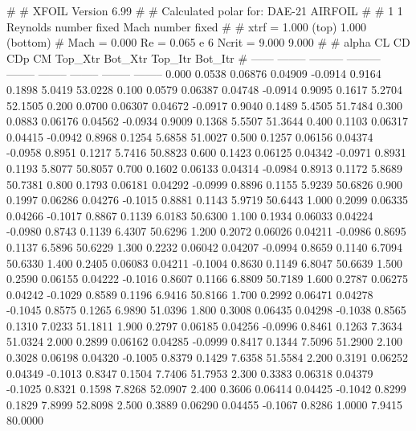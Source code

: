 #  
#       XFOIL         Version 6.99
#  
# Calculated polar for: DAE-21 AIRFOIL                                  
#  
# 1 1 Reynolds number fixed          Mach number fixed         
#  
# xtrf =   1.000 (top)        1.000 (bottom)  
# Mach =   0.000     Re =     0.065 e 6     Ncrit =   9.000  9.000
#  
#   alpha    CL        CD       CDp       CM     Top_Xtr  Bot_Xtr  Top_Itr  Bot_Itr
#  ------ -------- --------- --------- -------- -------- -------- -------- --------
   0.000   0.0538   0.06876   0.04909  -0.0914   0.9164   0.1898   5.0419  53.0228
   0.100   0.0579   0.06387   0.04748  -0.0914   0.9095   0.1617   5.2704  52.1505
   0.200   0.0700   0.06307   0.04672  -0.0917   0.9040   0.1489   5.4505  51.7484
   0.300   0.0883   0.06176   0.04562  -0.0934   0.9009   0.1368   5.5507  51.3644
   0.400   0.1103   0.06317   0.04415  -0.0942   0.8968   0.1254   5.6858  51.0027
   0.500   0.1257   0.06156   0.04374  -0.0958   0.8951   0.1217   5.7416  50.8823
   0.600   0.1423   0.06125   0.04342  -0.0971   0.8931   0.1193   5.8077  50.8057
   0.700   0.1602   0.06133   0.04314  -0.0984   0.8913   0.1172   5.8689  50.7381
   0.800   0.1793   0.06181   0.04292  -0.0999   0.8896   0.1155   5.9239  50.6826
   0.900   0.1997   0.06286   0.04276  -0.1015   0.8881   0.1143   5.9719  50.6443
   1.000   0.2099   0.06335   0.04266  -0.1017   0.8867   0.1139   6.0183  50.6300
   1.100   0.1934   0.06033   0.04224  -0.0980   0.8743   0.1139   6.4307  50.6296
   1.200   0.2072   0.06026   0.04211  -0.0986   0.8695   0.1137   6.5896  50.6229
   1.300   0.2232   0.06042   0.04207  -0.0994   0.8659   0.1140   6.7094  50.6330
   1.400   0.2405   0.06083   0.04211  -0.1004   0.8630   0.1149   6.8047  50.6639
   1.500   0.2590   0.06155   0.04222  -0.1016   0.8607   0.1166   6.8809  50.7189
   1.600   0.2787   0.06275   0.04242  -0.1029   0.8589   0.1196   6.9416  50.8166
   1.700   0.2992   0.06471   0.04278  -0.1045   0.8575   0.1265   6.9890  51.0396
   1.800   0.3008   0.06435   0.04298  -0.1038   0.8565   0.1310   7.0233  51.1811
   1.900   0.2797   0.06185   0.04256  -0.0996   0.8461   0.1263   7.3634  51.0324
   2.000   0.2899   0.06162   0.04285  -0.0999   0.8417   0.1344   7.5096  51.2900
   2.100   0.3028   0.06198   0.04320  -0.1005   0.8379   0.1429   7.6358  51.5584
   2.200   0.3191   0.06252   0.04349  -0.1013   0.8347   0.1504   7.7406  51.7953
   2.300   0.3383   0.06318   0.04379  -0.1025   0.8321   0.1598   7.8268  52.0907
   2.400   0.3606   0.06414   0.04425  -0.1042   0.8299   0.1829   7.8999  52.8098
   2.500   0.3889   0.06290   0.04455  -0.1067   0.8286   1.0000   7.9415  80.0000

